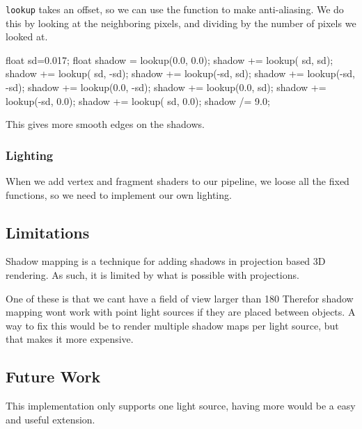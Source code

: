 \texttt{lookup} takes an offset, so we can use the function to make
anti-aliasing. We do this by looking at the neighboring pixels, and
dividing by the number of pixels we looked at.

\begin{cppcode}
    float sd=0.017;
    float shadow = lookup(0.0, 0.0);
    shadow += lookup( sd,  sd);
    shadow += lookup( sd, -sd);
    shadow += lookup(-sd,  sd);
    shadow += lookup(-sd, -sd);
    shadow += lookup(0.0, -sd);
    shadow += lookup(0.0,  sd);
    shadow += lookup(-sd, 0.0);
    shadow += lookup( sd, 0.0);
    shadow /= 9.0;
\end{cppcode}

This gives more smooth edges on the shadows.

\subsubsection*{Lighting}

When we add vertex and fragment shaders to our pipeline, we loose all
the fixed functions, so we need to implement our own lighting. 


\subsection{Limitations}

Shadow mapping is a technique for adding shadows in projection based
3D rendering. As such, it is limited by what is possible with
projections.

One of these is that we cant have a field of view larger than 180
Therefor shadow mapping wont work with point light sources if they are
placed between objects. A way to fix this would be to render multiple
shadow maps per light source, but that makes it more expensive.


\subsection{Future Work}

This implementation only supports one light source, having more would
be a easy and useful extension.


